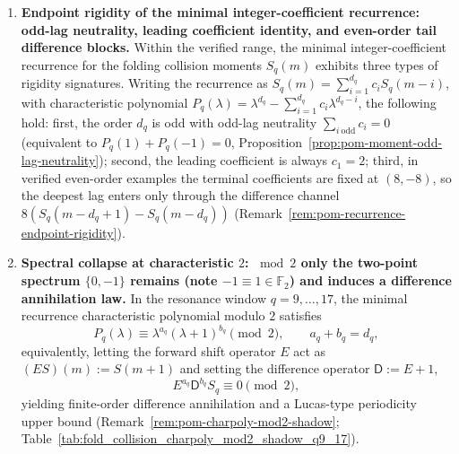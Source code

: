 \begin{theorem}
\begin{enumerate}
  \item \textbf{Endpoint rigidity of the minimal integer-coefficient recurrence: odd-lag neutrality, leading coefficient identity, and even-order tail difference blocks.}
  Within the verified range, the minimal integer-coefficient recurrence for the folding collision moments \(S_q(m)\) exhibits three types of rigidity signatures.
  Writing the recurrence as \(S_q(m)=\sum_{i=1}^{d_q}c_iS_q(m-i)\), with characteristic polynomial \(P_q(\lambda)=\lambda^{d_q}-\sum_{i=1}^{d_q}c_i\lambda^{d_q-i}\),
  the following hold: first, the order \(d_q\) is odd with odd-lag neutrality
  \(
  \sum_{i\ \mathrm{odd}}c_i=0
  \)
  (equivalent to \(P_q(1)+P_q(-1)=0\), Proposition~\ref{prop:pom-moment-odd-lag-neutrality});
  second, the leading coefficient is always \(c_1=2\);
  third, in verified even-order examples the terminal coefficients are fixed at \((8,-8)\), so the deepest lag enters only through the difference channel \(8(S_q(m-d_q+1)-S_q(m-d_q))\) (Remark~\ref{rem:pom-recurrence-endpoint-rigidity}).

  \item \textbf{Spectral collapse at characteristic \(2\): \(\bmod 2\) only the two-point spectrum \(\{0,-1\}\) remains (note \(-1\equiv 1\in\mathbb{F}_2\)) and induces a difference annihilation law.}
  In the resonance window \(q=9,\dots,17\), the minimal recurrence characteristic polynomial modulo \(2\) satisfies
  \[
  P_q(\lambda)\equiv \lambda^{a_q}(\lambda+1)^{b_q}\pmod 2,\qquad a_q+b_q=d_q,
  \]
  equivalently, letting the forward shift operator \(E\) act as \((ES)(m):=S(m+1)\) and setting the difference operator \(\mathsf{D}:=E+1\),
  \[
  E^{a_q}\mathsf{D}^{b_q}S_q\equiv 0\pmod 2,
  \]
  yielding finite-order difference annihilation and a Lucas-type periodicity upper bound (Remark~\ref{rem:pom-charpoly-mod2-shadow}; Table~\ref{tab:fold_collision_charpoly_mod2_shadow_q9_17}).


\end{enumerate}
\end{theorem}
